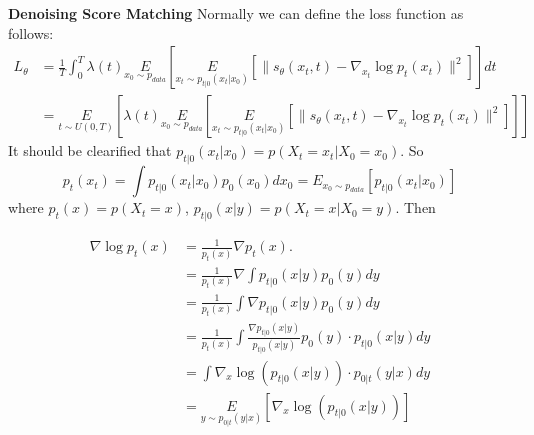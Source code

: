 \textbf{Denoising Score Matching}
Normally we can define the loss function as follows:
\begin{equation}
    \begin{aligned}
        L_\theta & = \frac{1}{T}\int_0^T\lambda(t)\underset{x_0\sim p_{data}}{E}\left[\underset{x_t\sim p_{t|0}(x_t|x_0)}{E}\left[\|s_\theta(x_t, t)-\nabla_{x_t}\log p_t(x_t)\|^2\right]\right]dt\\
        &=\underset{t\sim U(0, T)}{E}\left[\lambda(t)\underset{x_0\sim p_{data}}{E}\left[\underset{x_t\sim p_{t|0}(x_t|x_0)}{E}\left[\|s_\theta(x_t, t)-\nabla_{x_t}\log p_t(x_t)\|^2\right]\right]\right]
    \end{aligned}
\end{equation}
It should be clearified that $p_{t|0}(x_t|x_0)=p(X_t=x_t|X_0=x_0)$. So $$p_t(x_t)=\int p_{t|0}(x_t|x_0)p_0(x_0)dx_0=E_{x_0\sim p_{data}}\left[p_{t|0}(x_t|x_0)\right]$$
where $p_{t}(x)=p\left(X_{t}=x\right)$, $p_{t | 0}(x | y)=p\left(X_{t}=x | X_{0}=y\right)$. Then

\begin{equation}
    \begin{aligned}
    \nabla \log p_{t}(x) & =\frac{1}{p_{t}(x)} \nabla p_{t}(x) . \\
    & =\frac{1}{p_{t}(x)} \nabla \int p_{t | 0}(x | y) p_{0}(y) d y \\
    & =\frac{1}{p_{t}(x)} \int \nabla p_{t | 0}(x | y) p_{0}(y) d y \\
    & =\frac{1}{p_{t}(x)} \int \frac{\nabla p_{t | 0}(x | y)}{p_{t | 0}(x | y)} p_{0}(y) \cdot p_{t | 0}(x | y) d y \\
    & =\int \nabla_{x} \log \left(p_{t | 0}(x | y)\right) \cdot p_{0 | t}(y | x) d y \\
    & =\underset{y\sim p_{0|t}(y|x)}{E}\left[\nabla_{x} \log \left(p_{t | 0}(x | y)\right)\right]
    \end{aligned}
\end{equation}

